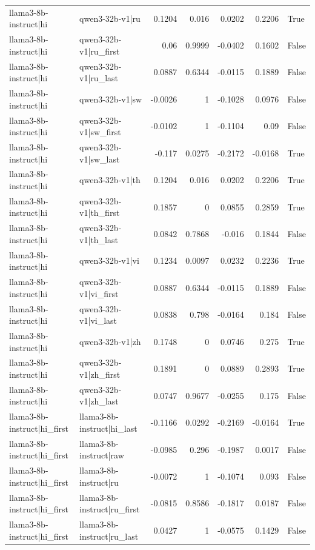 \begin{table}
\begin{tabular}{l l r r r r l}
llama3-8b-instruct|hi & qwen3-32b-v1|ru & 0.1204 & 0.016 & 0.0202 & 0.2206 & True \\
llama3-8b-instruct|hi & qwen3-32b-v1|ru_first & 0.06 & 0.9999 & -0.0402 & 0.1602 & False \\
llama3-8b-instruct|hi & qwen3-32b-v1|ru_last & 0.0887 & 0.6344 & -0.0115 & 0.1889 & False \\
llama3-8b-instruct|hi & qwen3-32b-v1|sw & -0.0026 & 1 & -0.1028 & 0.0976 & False \\
llama3-8b-instruct|hi & qwen3-32b-v1|sw_first & -0.0102 & 1 & -0.1104 & 0.09 & False \\
llama3-8b-instruct|hi & qwen3-32b-v1|sw_last & -0.117 & 0.0275 & -0.2172 & -0.0168 & True \\
llama3-8b-instruct|hi & qwen3-32b-v1|th & 0.1204 & 0.016 & 0.0202 & 0.2206 & True \\
llama3-8b-instruct|hi & qwen3-32b-v1|th_first & 0.1857 & 0 & 0.0855 & 0.2859 & True \\
llama3-8b-instruct|hi & qwen3-32b-v1|th_last & 0.0842 & 0.7868 & -0.016 & 0.1844 & False \\
llama3-8b-instruct|hi & qwen3-32b-v1|vi & 0.1234 & 0.0097 & 0.0232 & 0.2236 & True \\
llama3-8b-instruct|hi & qwen3-32b-v1|vi_first & 0.0887 & 0.6344 & -0.0115 & 0.1889 & False \\
llama3-8b-instruct|hi & qwen3-32b-v1|vi_last & 0.0838 & 0.798 & -0.0164 & 0.184 & False \\
llama3-8b-instruct|hi & qwen3-32b-v1|zh & 0.1748 & 0 & 0.0746 & 0.275 & True \\
llama3-8b-instruct|hi & qwen3-32b-v1|zh_first & 0.1891 & 0 & 0.0889 & 0.2893 & True \\
llama3-8b-instruct|hi & qwen3-32b-v1|zh_last & 0.0747 & 0.9677 & -0.0255 & 0.175 & False \\
llama3-8b-instruct|hi_first & llama3-8b-instruct|hi_last & -0.1166 & 0.0292 & -0.2169 & -0.0164 & True \\
llama3-8b-instruct|hi_first & llama3-8b-instruct|raw & -0.0985 & 0.296 & -0.1987 & 0.0017 & False \\
llama3-8b-instruct|hi_first & llama3-8b-instruct|ru & -0.0072 & 1 & -0.1074 & 0.093 & False \\
llama3-8b-instruct|hi_first & llama3-8b-instruct|ru_first & -0.0815 & 0.8586 & -0.1817 & 0.0187 & False \\
llama3-8b-instruct|hi_first & llama3-8b-instruct|ru_last & 0.0427 & 1 & -0.0575 & 0.1429 & False \\

\end{tabular}
\end{table}
